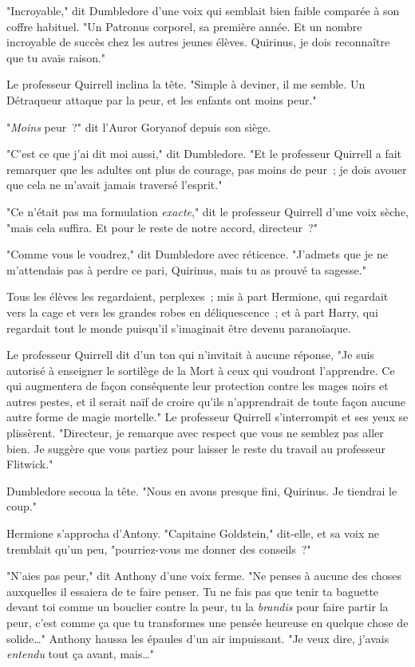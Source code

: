 "Incroyable," dit Dumbledore d'une voix qui semblait bien faible comparée à son coffre habituel. "Un Patronus corporel, sa première année. Et un nombre incroyable de succès chez les autres jeunes élèves. Quirinus, je dois reconnaître que tu avais raison."

Le professeur Quirrell inclina la tête. "Simple à deviner, il me semble. Un Détraqueur attaque par la peur, et les enfants ont moins peur."

"\emph{Moins} peur~?" dit l'Auror Goryanof depuis son siège.

"C'est ce que j'ai dit moi aussi," dit Dumbledore. "Et le professeur Quirrell a fait remarquer que les adultes ont plus de courage, pas moins de peur~; je dois avouer que cela ne m'avait jamais traversé l'esprit."

"Ce n'était pas ma formulation \emph{exacte}," dit le professeur Quirrell d'une voix sèche, "mais cela suffira. Et pour le reste de notre accord, directeur~?"

"Comme vous le voudrez," dit Dumbledore avec réticence. "J'admets que je ne m'attendais pas à perdre ce pari, Quirinus, mais tu as prouvé ta sagesse."

Tous les élèves les regardaient, perplexes~; mis à part Hermione, qui regardait vers la cage et vers les grandes robes en déliquescence~; et à part Harry, qui regardait tout le monde puisqu'il s'imaginait être devenu paranoïaque.

Le professeur Quirrell dit d'un ton qui n'invitait à aucune réponse, "Je suis autorisé à enseigner le sortilège de la Mort à ceux qui voudront l'apprendre. Ce qui augmentera de façon conséquente leur protection contre les mages noirs et autres pestes, et il serait naïf de croire qu'ils n'apprendrait de toute façon aucune autre forme de magie mortelle." Le professeur Quirrell s'interrompit et ses yeux se plissèrent. "Directeur, je remarque avec respect que vous ne semblez pas aller bien. Je suggère que vous partiez pour laisser le reste du travail au professeur Flitwick."

Dumbledore secoua la tête. "Nous en avons presque fini, Quirinus. Je tiendrai le coup."

Hermione s'approcha d'Antony. "Capitaine Goldstein," dit-elle, et sa voix ne tremblait qu'un peu, "pourriez-vous me donner des conseils~?"

"N'aies pas peur," dit Anthony d'une voix ferme. "Ne penses à aucune des choses auxquelles il essaiera de te faire penser. Tu ne fais pas que tenir ta baguette devant toi comme un bouclier contre la peur, tu la \emph{brandis} pour faire partir la peur, c'est comme ça que tu transformes une pensée heureuse en quelque chose de solide…" Anthony haussa les épaules d'un air impuissant. "Je veux dire, j'avais \emph{entendu} tout ça avant, mais…"

